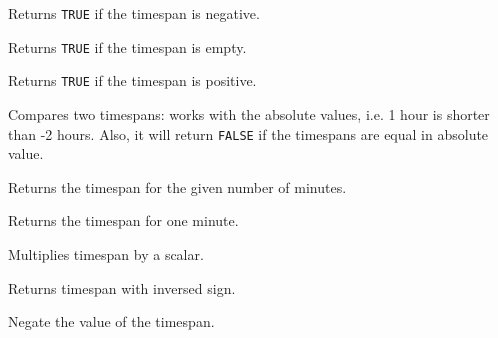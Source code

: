 Returns {\tt TRUE} if the timespan is negative.

\label{wxtimespanisnull}


Returns {\tt TRUE} if the timespan is empty.

\label{wxtimespanispositive}


Returns {\tt TRUE} if the timespan is positive.

\label{wxtimespanisshorterthan}


Compares two timespans: works with the absolute values, i.e. 1
hour is shorter than -2 hours. Also, it will return {\tt FALSE} if
the timespans are equal in absolute value.

\label{wxtimespanminutes}


Returns the timespan for the given number of minutes.

\label{wxtimespanminute}


Returns the timespan for one minute.

\label{wxtimespanmultiply}




Multiplies timespan by a scalar.

\label{wxtimespannegate}


Returns timespan with inversed sign.

\label{wxtimespanneg}



Negate the value of the timespan.

